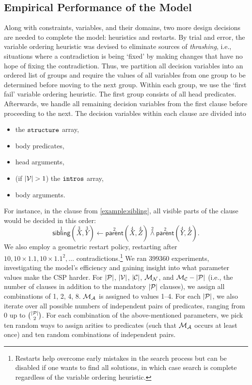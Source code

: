 \subsection{Empirical Performance of the Model}\label{sec:1experiment1}

Along with constraints, variables, and their domains, two more design decisions
are needed to complete the model: heuristics and restarts. By trial and error,
the variable ordering heuristic was devised to eliminate sources of
\emph{thrashing}, i.e., situations where a contradiction is being `fixed' by
making changes that have no hope of fixing the contradiction. Thus, we partition
all decision variables into an ordered list of groups and require the values of
all variables from one group to be determined before moving to the next group.
Within each group, we use the `first fail' variable ordering heuristic. The
first group consists of all head predicates. Afterwards, we handle all remaining
decision variables from the first clause before proceeding to the next. The
decision variables within each clause are divided into
\begin{itemize}
\item the $\texttt{\textup{structure}}$ array,
\item body predicates,
\item head arguments,
\item (if $|\mathcal{V}{}| > 1$) the $\texttt{\textup{intros}}$ array,
\item body arguments.
\end{itemize}
For instance, in the clause from \cref{example:sibling}, all visible parts of
the clause would be decided in this order:
\[
  \overset{1}{\mathsf{sibling}}(\overset{3}{X}, \overset{3}{Y}) \gets
  \overset{2}{\mathsf{parent}}(\overset{4}{X}, \overset{4}{Z})
  \overset{2}{\land} \overset{2}{\mathsf{parent}}(\overset{4}{Y},
  \overset{4}{Z}).
\]
We also employ a geometric restart policy, restarting after $10, 10 \times 1.1,
10 \times 1.1^2, \dots$ contradictions.\footnote{Restarts help overcome early
  mistakes in the search process but can be disabled if one wants to find all
  solutions, in which case search is complete regardless of the variable
  ordering heuristic.} We ran \num{399360} experiments, investigating the
model's efficiency and gaining insight into what parameter values make the CSP
harder. For $|\mathcal{P}{}|$, $|\mathcal{V}{}|$, $|\mathcal{C}{}|$,
$\mathcal{M}_{\mathcal{N}}{}$, and $\mathcal{M}_{\mathcal{C}}{} - |\mathcal{P}{}|$ (i.e., the number of
clauses in addition to the mandatory $|\mathcal{P}{}|$ clauses), we assign all
combinations of 1, 2, 4, 8. $\mathcal{M}_{\mathcal{A}}{}$ is assigned to values 1--4. For each
$|\mathcal{P}{}|$, we also iterate over all possible numbers of independent
pairs of predicates, ranging from 0 up to $\binom{|\mathcal{P}{}|}{2}$. For each
combination of the above-mentioned parameters, we pick ten random ways to assign
arities to predicates (such that $\mathcal{M}_{\mathcal{A}}{}$ occurs at least once) and ten
random combinations of independent pairs.

